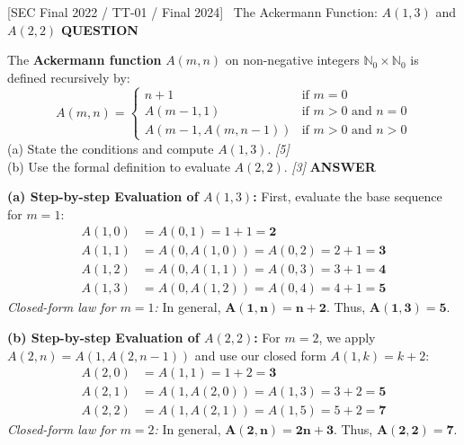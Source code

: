 \documentclass[11pt,a4paper]{article}
\newcommand{\Qlabel}{\textbf{\color{navy}\footnotesize\MakeUppercase{Question}}\par\smallskip}
\newcommand{\Alabel}{\textbf{\color{teal}\footnotesize\MakeUppercase{Answer}}\par\smallskip}
\begin{document}
\begin{exambox}{[SEC Final 2022 / TT-01 / Final 2024] \ The Ackermann Function: $A(1,3)$ and $A(2,2)$}
\Qlabel
The \textbf{Ackermann function} $A(m, n)$ on non-negative integers $\mathbb{N}_0 \times \mathbb{N}_0$ is defined recursively by:
\[
A(m, n) = \begin{cases}
n + 1 & \text{if } m = 0 \\
A(m - 1, 1) & \text{if } m > 0 \text{ and } n = 0 \\
A(m - 1, A(m, n - 1)) & \text{if } m > 0 \text{ and } n > 0
\end{cases}
\]
(a) State the conditions and compute $A(1, 3)$. \hfill\textit{[5]}\\
(b) Use the formal definition to evaluate $A(2, 2)$. \hfill\textit{[3]}
\tcblower
\Alabel
\textbf{(a) Step-by-step Evaluation of $A(1, 3)$:}
First, evaluate the base sequence for $m = 1$:
\begin{align*}
A(1, 0) &= A(0, 1) = 1 + 1 = \mathbf{2} \\
A(1, 1) &= A(0, A(1, 0)) = A(0, 2) = 2 + 1 = \mathbf{3} \\
A(1, 2) &= A(0, A(1, 1)) = A(0, 3) = 3 + 1 = \mathbf{4} \\
A(1, 3) &= A(0, A(1, 2)) = A(0, 4) = 4 + 1 = \mathbf{5}
\end{align*}
\textit{Closed-form law for $m=1$:} In general, $\mathbf{A(1, n) = n + 2}$. Thus, $\mathbf{A(1, 3) = 5}$.

\medskip
\textbf{(b) Step-by-step Evaluation of $A(2, 2)$:}
For $m = 2$, we apply $A(2, n) = A(1, A(2, n-1))$ and use our closed form $A(1, k) = k + 2$:
\begin{align*}
A(2, 0) &= A(1, 1) = 1 + 2 = \mathbf{3} \\
A(2, 1) &= A(1, A(2, 0)) = A(1, 3) = 3 + 2 = \mathbf{5} \\
A(2, 2) &= A(1, A(2, 1)) = A(1, 5) = 5 + 2 = \mathbf{7}
\end{align*}
\textit{Closed-form law for $m=2$:} In general, $\mathbf{A(2, n) = 2n + 3}$. Thus, $\mathbf{A(2, 2) = 7}$.
\end{exambox}
\end{document}
